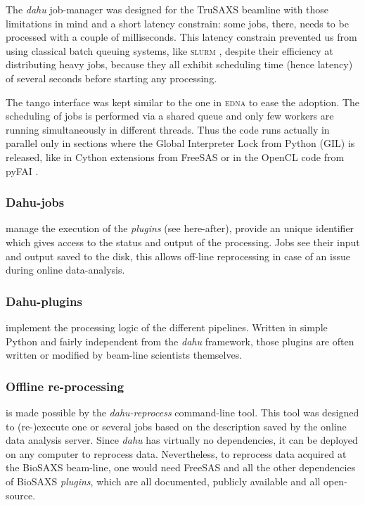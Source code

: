 \documentclass[preprint]{iucr}              %
\begin{document}
The \textit{dahu} job-manager was designed for the TruSAXS beamline \cite{id02_2022} with those limitations in mind and a short latency constrain: some jobs, there, needs to be processed with a couple of milliseconds. 
This latency constrain prevented us from using classical batch queuing systems, like \textsc{slurm} \cite{slurm}, despite their efficiency at distributing heavy jobs, because they all exhibit scheduling time (hence latency) of several seconds before starting any processing.

The tango interface \cite{tango} was kept similar to the one in \textsc{edna} to ease the adoption.
The scheduling of jobs is performed via a shared queue and only few workers are running simultaneously in different threads.
Thus the code runs actually in parallel only in sections where the Global Interpreter Lock from Python (GIL) is released, like in Cython extensions \cite{cython} from FreeSAS or in the OpenCL code from pyFAI \cite{pyFAI_gpu}.



\subsubsection{Dahu-jobs}
manage the execution of the \textit{plugins} (see here-after), provide an unique identifier which gives access to the status and output of the processing.
Jobs see their input and output saved to the disk, this allows off-line reprocessing in case of an issue during online data-analysis.

\subsubsection{Dahu-plugins} implement the processing logic of the different pipelines.
Written in simple Python and fairly independent from the \textit{dahu} framework, those plugins are often written or modified by beam-line scientists themselves.

\subsubsection{Offline re-processing}
is made possible by the \textit{dahu-reprocess} command-line tool.
This tool was designed to (re-)execute one or several jobs based on the description saved by the online data analysis server. 
Since \textit{dahu} has virtually no dependencies, it can be deployed on any computer to reprocess data. 
Nevertheless, to reprocess data acquired at the BioSAXS beam-line, one would need FreeSAS and all the other dependencies of BioSAXS \textit{plugins}, which are all documented, publicly available and all open-source.
\end{document}
